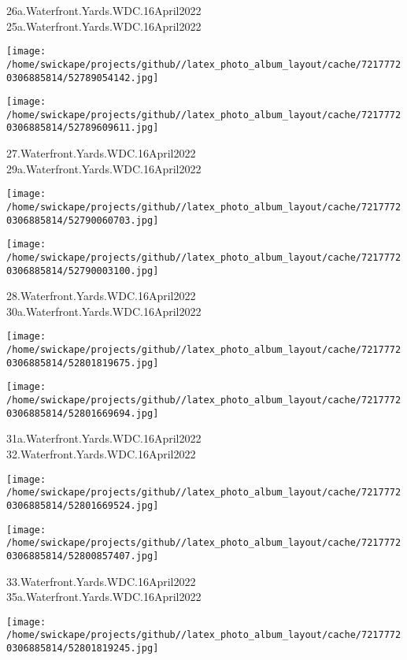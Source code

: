 \documentclass[10pt,letterpaper]{article}
\begin{document}
26a.Waterfront.Yards.WDC.16April2022\\
25a.Waterfront.Yards.WDC.16April2022
\pagebreak

\texttt{[image: /home/swickape/projects/github//latex\_photo\_album\_layout/cache/72177720306885814/52789054142.jpg]}

\vspace{0.25in}
\texttt{[image: /home/swickape/projects/github//latex\_photo\_album\_layout/cache/72177720306885814/52789609611.jpg]}

27.Waterfront.Yards.WDC.16April2022\\
29a.Waterfront.Yards.WDC.16April2022
\pagebreak

\texttt{[image: /home/swickape/projects/github//latex\_photo\_album\_layout/cache/72177720306885814/52790060703.jpg]}

\vspace{0.25in}
\texttt{[image: /home/swickape/projects/github//latex\_photo\_album\_layout/cache/72177720306885814/52790003100.jpg]}

28.Waterfront.Yards.WDC.16April2022\\
30a.Waterfront.Yards.WDC.16April2022
\pagebreak

\texttt{[image: /home/swickape/projects/github//latex\_photo\_album\_layout/cache/72177720306885814/52801819675.jpg]}

\vspace{0.25in}
\texttt{[image: /home/swickape/projects/github//latex\_photo\_album\_layout/cache/72177720306885814/52801669694.jpg]}

31a.Waterfront.Yards.WDC.16April2022\\
32.Waterfront.Yards.WDC.16April2022
\pagebreak

\texttt{[image: /home/swickape/projects/github//latex\_photo\_album\_layout/cache/72177720306885814/52801669524.jpg]}

\vspace{0.25in}
\texttt{[image: /home/swickape/projects/github//latex\_photo\_album\_layout/cache/72177720306885814/52800857407.jpg]}

33.Waterfront.Yards.WDC.16April2022\\
35a.Waterfront.Yards.WDC.16April2022
\pagebreak

\texttt{[image: /home/swickape/projects/github//latex\_photo\_album\_layout/cache/72177720306885814/52801819245.jpg]}
\end{document}
